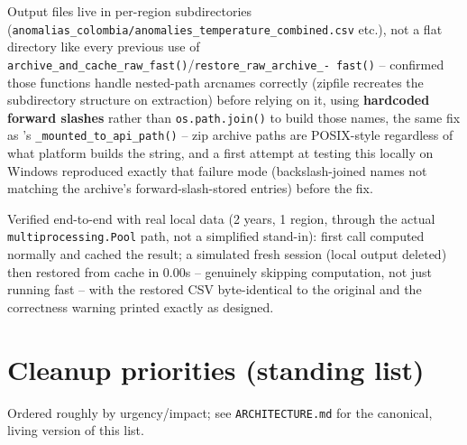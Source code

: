 \documentclass[11pt]{article}
\begin{document}
Output files live in per-region subdirectories
(\texttt{anomalias\_colombia/anomalies\_temperature\_combined.csv} etc.),
not a flat directory like every previous use of
\texttt{archive\_and\_cache\_raw\_fast()}/\texttt{restore\_raw\_archive\_-
fast()} -- confirmed those functions handle nested-path arcnames
correctly (zipfile recreates the subdirectory structure on extraction)
before relying on it, using \textbf{hardcoded forward slashes} rather
than \texttt{os.path.join()} to build those names, the same fix as
's \texttt{\_mounted\_to\_api\_path()} --
zip archive paths are POSIX-style regardless of what platform builds the
string, and a first attempt at testing this locally on Windows
reproduced exactly that failure mode (backslash-joined names not
matching the archive's forward-slash-stored entries) before the fix.

Verified end-to-end with real local data (2 years, 1 region, through the
actual \texttt{multiprocessing.Pool} path, not a simplified stand-in):
first call computed normally and cached the result; a simulated fresh
session (local output deleted) then restored from cache in 0.00s --
genuinely skipping computation, not just running fast -- with the
restored CSV byte-identical to the original and the correctness warning
printed exactly as designed.

\section{Cleanup priorities (standing list)}

Ordered roughly by urgency/impact; see \texttt{ARCHITECTURE.md} for the
canonical, living version of this list.
\end{document}
